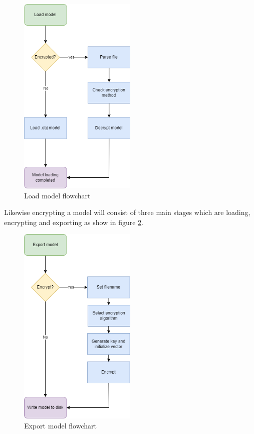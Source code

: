 \documentclass[11pt]{article}
\begin{document}
\begin{figure}[H]
  \centering
  \includegraphics[width=0.5\textwidth]{images/load_model_flowchart.png}
  \caption{Load model flowchart}
  \label{fig:load_model_flowchart}
\end{figure}

Likewise encrypting a model will consist of three main stages which are loading, encrypting
and exporting as show in figure \ref{fig:export_model_flowchart}.
\begin{figure}[H]
  \centering
  \includegraphics[width=0.5\textwidth]{images/export_model_flowchart.png}
  \caption{Export model flowchart}
  \label{fig:export_model_flowchart}
\end{figure}
\end{document}

